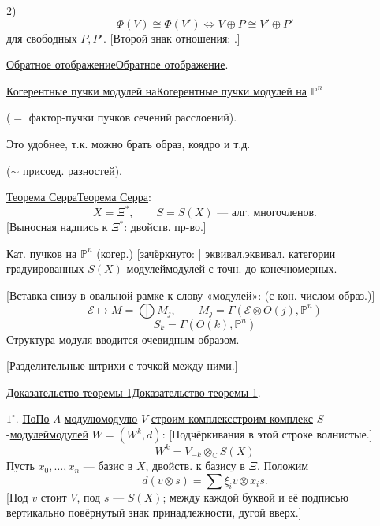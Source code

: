 \documentclass[11pt]{article}
\theoremstyle{definition}
\theoremstyle{remark}
\newcommand{\Unclear}[3]{%
  \begingroup\color{orange!70!black}%
  [Unresolved reading #1/#2: #3]\endgroup%
}
\renewcommand{\Unclear}[3]{%
  \begingroup\color{orange!65!black}%
  \ifmmode\text{[неясно: #3]}\else[неясно: #3]\fi\endgroup%
}
\let\DiplomaticMathUnderline\underline
\renewcommand{\underline}[1]{\ifmmode\DiplomaticMathUnderline{#1}\else\uline{#1}\fi}
\begin{document}
2)
\begin{equation*}
\Phi(V)\cong\Phi(V')\Longleftrightarrow
V\oplus P\cong V'\oplus P'
\end{equation*}
для свободных $P,P'$.
[Второй знак отношения: \Unclear{GELFAND-P000759}{theorem-stable-relation}{$\cong$ или $=$; над двумя чертами слабый штрих}.]

\underline{Обратное отображение}.

\underline{Когерентные пучки модулей на} $\mathbb P^n$

($=$ фактор-пучки пучков сечений расслоений).

Это удобнее, т.к. можно брать образ, коядро и т.д.

($\sim$ присоед. разностей).

\underline{Теорема Серра}:
\begin{equation*}
X=\Xi^*,\qquad S=S(X)\text{ — алг. многочленов.}
\end{equation*}
[Выносная надпись к $\Xi^*$: двойств. пр-во.]

Кат. пучков на $\mathbb P^n$ (когер.)
[зачёркнуто: \Unclear{GELFAND-P000759}{serre-cancelled-word}{по / до}]
\underline{эквивал.} категории градуированных
$S(X)$-\underline{модулей} с точн. до конечномерных.

[Вставка снизу в овальной рамке к слову «модулей»: (с кон. числом образ.)]
\begin{equation*}
\mathcal E\longmapsto M=\bigoplus M_j,\qquad
M_j=\Gamma(\mathcal E\otimes O(j),\mathbb P^n)
\end{equation*}
\begin{equation*}
S_k=\Gamma(O(k),\mathbb P^n)
\end{equation*}
Структура модуля вводится очевидным образом.

[Разделительные штрихи с точкой между ними.]

\underline{Доказательство теоремы 1}.

$1^{\circ}$. \underline{По} $\Lambda$-\underline{модулю} $V$
\underline{строим комплекс} $S$-\underline{модулей}
$W=(W^k,d)$:
[Подчёркивания в этой строке волнистые.]
\begin{equation*}
W^k=V_{-k}\otimes_{\mathbb C}S(X)
\end{equation*}
Пусть $x_0,\ldots,x_n$ — базис в $X$, двойств. к базису в $\Xi$. Положим
\begin{equation*}
d(v\otimes s)=\sum\xi_i v\otimes x_i s.
\end{equation*}
[Под $v$ стоит $V$, под $s$ — $S(X)$; между каждой буквой и её подписью
вертикально повёрнутый знак принадлежности, дугой вверх.]
\end{document}
